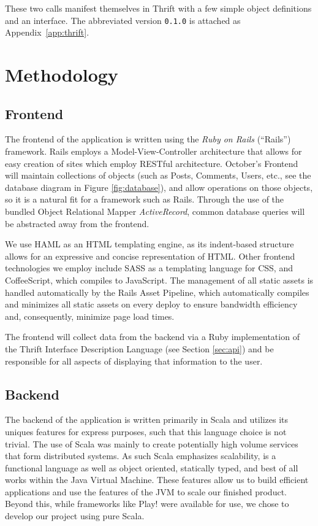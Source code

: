 \documentclass[11pt,letterpaper]{article}
\begin{document}
These two calls manifest themselves in Thrift with a few simple object
definitions and an interface.  The abbreviated version \texttt{0.1.0} is
attached as Appendix~\ref{app:thrift}.

\section{Methodology}
\subsection{Frontend}
The frontend of the application is written using the \textit{Ruby on Rails} (``Rails'') framework.
Rails employs a Model-View-Controller architecture that allows for easy creation of sites which employ RESTful architecture.
October's Frontend will maintain collections of objects (such as Posts, Comments, Users, etc., see the database diagram in Figure \ref{fig:database}), and allow operations on those objects, so it is a natural fit for a framework such as Rails.
Through the use of the bundled Object Relational Mapper \textit{ActiveRecord}, common database queries will be abstracted away from the frontend.

We use HAML as an HTML templating engine, as its indent-based structure allows for an expressive and concise representation of HTML.
Other frontend technologies we employ include SASS as a templating language for CSS, and CoffeeScript, which compiles to JavaScript.
The management of all static assets is handled automatically by the Rails Asset Pipeline, which automatically compiles and minimizes all static assets on every deploy to ensure bandwidth efficiency and, consequently, minimize page load times.

The frontend will collect data from the backend via a Ruby implementation of the Thrift Interface Description Language (see Section \ref{sec:api}) and be responsible for all aspects of displaying that information to the user.

\subsection{Backend}
\label{sec:backend-implementation}
The backend of the application is written primarily in Scala and utilizes its uniques features for express purposes, such that this language choice is not trivial. The use of Scala was mainly to create potentially high volume services that form distributed systems. As such Scala emphasizes scalability, is a functional language as well as object oriented, statically typed, and best of all works within the Java Virtual Machine. These features allow us to build efficient applications and use the features of the JVM to scale our finished product. Beyond this, while frameworks like Play! were available for use, we chose to develop our project using pure Scala.
\end{document}
